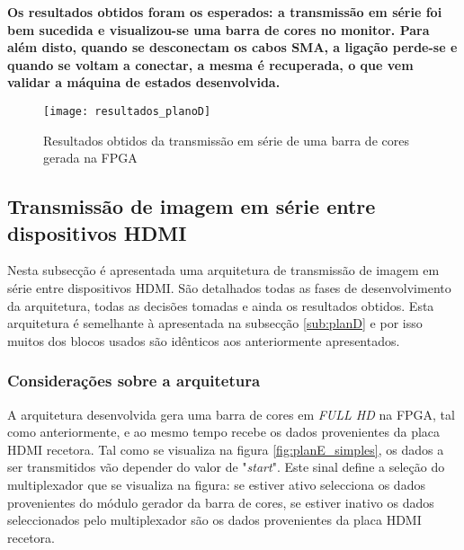 \begin{center}
	\lrboxbrace[\Vert][\Vert] {}
	{\textbf{Os resultados obtidos foram os esperados: a transmissão em série foi bem sucedida e visualizou-se uma barra de cores no monitor. Para além disto, quando se desconectam os cabos SMA, a ligação perde-se e quando se voltam a conectar, a mesma é recuperada, o que vem validar a máquina de estados desenvolvida.}}
\end{center}

\begin{figure}[h!]
	\begin{center}
		\leavevmode
		\texttt{[image: resultados\_planoD]}
		\captionsetup{width=1.0\linewidth}
		\caption[Resultados obtidos da transmissão em série de uma barra de cores gerada na FPGA]{Resultados obtidos da transmissão em série de uma barra de cores gerada na FPGA}
		\label{fig:planD_resultados}
	\end{center}
\end{figure}



\subsection{Transmissão de imagem em série entre dispositivos HDMI} \label{sub:planE}

Nesta subsecção é apresentada uma arquitetura de transmissão de imagem em série entre dispositivos HDMI. São detalhados todas as fases de desenvolvimento da arquitetura, todas as decisões tomadas e ainda os resultados obtidos. Esta arquitetura é semelhante à apresentada na subsecção \ref{sub:planD} e por isso muitos dos blocos usados são idênticos aos anteriormente apresentados.

\subsubsection{Considerações sobre a arquitetura} \label{subsub:planE_considerações}

A arquitetura desenvolvida gera uma barra de cores em \textit{FULL HD} na FPGA, tal como anteriormente, e ao mesmo tempo recebe os dados provenientes da placa HDMI recetora. Tal como se visualiza na figura \ref{fig:planE_simples}, os dados a ser transmitidos vão depender do valor de "\textit{start}". Este sinal define a seleção do multiplexador que se visualiza na figura: se estiver ativo selecciona os dados provenientes do módulo gerador da barra de cores, se estiver inativo os dados seleccionados pelo multiplexador são os dados provenientes da placa HDMI recetora.

